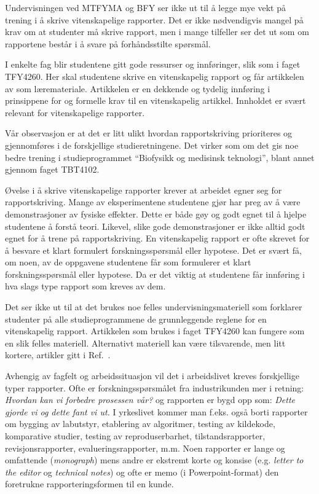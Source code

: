 \documentclass{article}
\begin{document}
Undervisningen ved MTFYMA og BFY ser ikke ut til å legge mye vekt på trening i å skrive vitenskapelige rapporter. Det er ikke nødvendigvis mangel på krav om at studenter må skrive rapport, men i mange tilfeller ser det ut som om rapportene består i å svare på forhåndsstilte spørsmål.

I enkelte fag blir studentene gitt gode ressurser og innføringer, slik som i faget TFY4260. Her skal studentene skrive en vitenskapelig rapport og får artikkelen av \citet{Ecarnot2015} som læremateriale. Artikkelen er en dekkende og tydelig innføring i prinsippene for og formelle krav til en vitenskapelig artikkel. Innholdet er svært relevant for vitenskapelige rapporter.

Vår observasjon er at det er litt ulikt hvordan rapportskriving prioriteres og gjennomføres i de forskjellige studieretningene. Det virker som om det gis noe bedre trening i studieprogrammet ``Biofysikk og medisinsk teknologi'', blant annet gjennom faget TBT4102.

Øvelse i å skrive vitenskapelige rapporter krever at arbeidet egner seg for rapportskriving. Mange av eksperimentene studentene gjør har preg av å være demonstrasjoner av fysiske effekter. Dette er både gøy og godt egnet til å hjelpe studentene å forstå teori. Likevel, slike gode demonstrasjoner er ikke alltid godt egnet for å trene på rapportskriving. En vitenskapelig rapport er ofte skrevet for å besvare et klart formulert forskningsspørsmål eller hypotese. Det er svært få, om noen, av de oppgavene studentene får som formulerer et klart forskningsspørsmål eller hypotese. Da er det viktig at studentene får innføring i hva slags type rapport som kreves av dem.

Det ser ikke ut til at det brukes noe felles undervisningsmateriell som forklarer studenter på alle studieprogrammene de grunnleggende reglene for en vitenskapelig rapport. Artikkelen som brukes i faget TFY4260 kan fungere som en slik felles materiell. Alternativt materiell kan være tilsvarende, men litt kortere, artikler gitt i Ref.~\cite{Lapin1994,Senturia2003}.

Avhengig av fagfelt og arbeidssituasjon vil det i arbeidslivet kreves forskjellige typer rapporter. Ofte er forskningsspørsmålet fra industrikunden mer i retning: {\em Hvordan kan vi forbedre prosessen vår?}  og rapporten er bygd opp som: {\em Dette gjorde vi og dette fant vi ut.}  I yrkeslivet kommer man f.eks. også borti rapporter om bygging av labutstyr, etablering av algoritmer, testing av kildekode, komparative studier, testing av reproduserbarhet, tilstandsrapporter, revisjonsrapporter, evalueringsrapporter, m.m. Noen rapporter er lange og omfattende (\emph{monograph}) mens andre er ekstremt korte og konsise (e.g. \emph{letter to the editor} og \emph{technical notes}) og ofte er memo (i Powerpoint-format) den foretrukne rapporteringsformen til en kunde.
\end{document}
